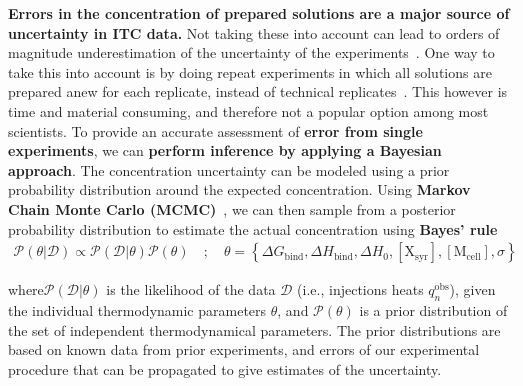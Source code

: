 \documentclass[10pt,final]{article}
\begin{document}
\textbf{Errors in the concentration of prepared solutions are a major source of uncertainty in ITC data.} Not taking these into account can lead to orders of magnitude underestimation of the uncertainty of the experiments~\cite{Myszka2003a,Tellinghuisen2011a}.
One way to take this into account is by doing repeat experiments in which all solutions are prepared anew for each replicate, instead of technical replicates~\cite{Vaux2012a}. This however is time and material consuming, and therefore not a popular option among most scientists. 
To provide an accurate assessment of \textbf{error from single experiments}, we can \textbf{perform inference by applying a Bayesian approach}.  %
The concentration uncertainty can be modeled using a prior probability distribution around the expected concentration.  %
% 
Using \textbf{Markov Chain Monte Carlo (MCMC)}~\cite{Metropolis1953a,Hastings1970a}, we can then sample from a posterior probability distribution to estimate the actual concentration using\textbf{ Bayes' rule}  %
\begin{align}
	\mathcal{P}\left(\theta | \mathcal{D} \right) \propto  \mathcal{P}(\mathcal{D} | \theta) \mathcal{P}\left(\theta\right) \quad;\quad \theta   =  \left\{ \Delta G_\mathrm{bind}, \Delta H_\mathrm{bind}, \Delta H_0, [\mathrm{X_{syr}}], [\mathrm{M_{cell}}], \sigma \right\}
\end{align}

where$\mathcal{P}(\mathcal{D}|\theta)$ is the likelihood of the data $\mathcal{D}$ (i.e., injections heats $q_n^\mathrm{obs}$), given the individual thermodynamic parameters $\theta$, and $\mathcal{P}(\theta)$ is a prior distribution of the set of independent thermodynamical parameters. The prior distributions are based on known data from prior experiments, and errors of our experimental procedure that can be propagated to give estimates of the uncertainty.
\end{document}
